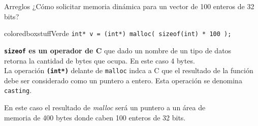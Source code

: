 \documentclass[aspectratio=169]{beamer}
\begin{document}
\begin{frame}[fragile]{Arreglos}
    ¿Cómo solicitar memoria dinámica para un vector de 100 enteros de 32 bits?\\
    \bigskip
    \pause
    \begin{beamercolorbox}[wd=0.9\textwidth,sep=0.5em]{coloredboxstuffVerde}
    \verb|int* v = (int*) malloc( sizeof(int) * 100 );|
    \end{beamercolorbox}
    \pause
    \bigskip
    \textbf{\texttt{sizeof} es un operador de C} que dado un nombre de un tipo de datos\\
    retorna la cantidad de bytes que ocupa. En este caso 4 bytes.\\
    \bigskip
    La operación \textbf{\texttt{(int*)}} delante de \texttt{malloc} indca a C que el resultado de la función\\
    debe ser considerado como un puntero a entero. Esta operación se denomina \texttt{casting}.\\
    \bigskip
    \begin{center}
    \textcolor{verdeuca}{
    En este caso el resultado de \emph{malloc} será un puntero a un área de\\ memoria de 400 bytes donde caben 100 enteros de 32 bits.
    }
    \end{center}
\end{frame}
\end{document}
